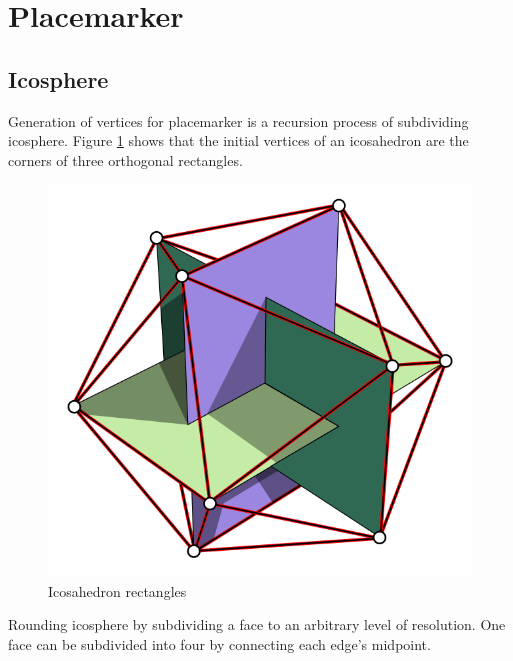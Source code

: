 \section{Placemarker}

\subsection{Icosphere}

Generation of vertices for placemarker is a recursion process of subdividing icosphere. Figure \ref{fig:icosahedron-rectangles} shows that the initial vertices of an icosahedron are the corners of three orthogonal rectangles.

\begin{figure}[H]
\caption[icosahedron-rectangles]{Icosahedron rectangles \parencite{wiki.icosahedron-rectangles.2006}}
\label{fig:icosahedron-rectangles}
\centering
\includegraphics[width=\linewidth]{Figures/icosahedron-rectangles.png}
\decoRule
\end{figure}

Rounding icosphere by subdividing a face to an arbitrary level of resolution. One face can be subdivided into four by connecting each edge's midpoint.

